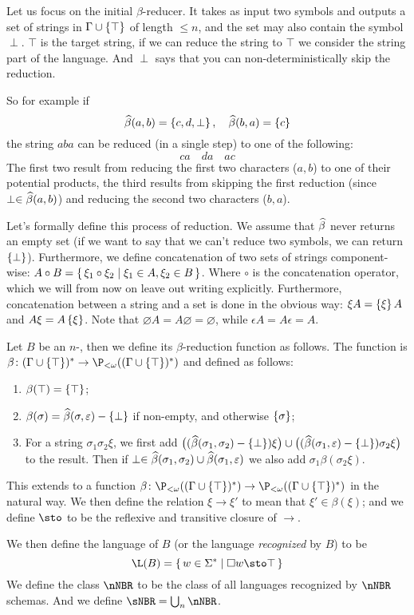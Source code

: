 \documentclass{llncs}
\begin{document}
Let us focus on the initial $\beta$-reducer.
It takes as input two symbols and outputs a set of strings in $\Gamma\cup\set\top$ of length $\leq n$, and the set may also
contain the symbol $\perp$.
$\top$ is the target string, if we can reduce the string to $\top$ we consider the string part of the language.
And $\perp$ says that you can non-deterministically skip the reduction.

So for example if
$$ \hb(a,b) = \set{c,d,\perp},\quad \hb(b,a) = \set{c} $$
the string $aba$ can be reduced (in a single step) to one of the following:
$$ ca\quad da\quad ac $$
The first two result from reducing the first two characters ($a,b$) to one of their potential products, the third results from
skipping the first reduction (since $\perp\in\widehat\beta(a,b)$) and reducing the second two characters ($b,a$).

Let's formally define this process of reduction.
We assume that $\widehat\beta$ never returns an empty set (if we want to say that we can't reduce two symbols, we can return $\set\perp$).
Furthermore, we define concatenation of two sets of strings component-wise:
$A\circ B=\set{\xi_1\circ\xi_2}[\xi_1\in A,\xi_2\in B]$.
Where $\circ$ is the concatenation operator, which we will from now on leave out writing explicitly.
Furthermore, concatenation between a string and a set is done in the obvious way: $\xi A=\set\xi A$ and $A\xi=A\set\xi$.
Note that $\varnothing A=A\varnothing=\varnothing$, while $\epsilon A=A\epsilon=A$.

\begin{definition}

    Let $B$ be an $n$-\NBR, then we define its $\beta$-reduction function as follows.
    The function is $\beta\colon(\Gamma\cup\set\top)^*\to\P_{<\omega}((\Gamma\cup\set\top)^*)$ and defined as follows:
    \begin{enumerate}
        \item $\beta(\top)=\set\top$;
        \item $\beta(\sigma)=\hb(\sigma,\epsilon)-\set\perp$ if non-empty, and otherwise $\set\sigma$;
        \item For a string $\sigma_1\sigma_2\xi$, we first add
        $\bigl((\hb(\sigma_1,\sigma_2)-\set\perp)\xi\bigr)\cup\bigl((\hb(\sigma_1,\epsilon)-\set\perp)\sigma_2\xi\bigr)$ to
        the result.
        Then if $\perp\in\widehat\beta(\sigma_1,\sigma_2)\cup\widehat\beta(\sigma_1,\varepsilon)$ we also add $\sigma_1\beta(\sigma_2\xi)$.
    \end{enumerate}
    This extends to a function $\beta\colon\P_{<\omega}((\Gamma\cup\set\top)^*)\to\P_{<\omega}((\Gamma\cup\set\top)^*)$
    in the natural way.
    We then define the relation $\xi\to\xi'$ to mean that $\xi'\in\beta(\xi)$; and we define $\sto$ to be the reflexive and
    transitive closure of $\to$.

    We then define the language of $B$ (or the language \emph{recognized} by $B$) to be
    $$ \L(B) = \set{w\in\Sigma^*}[\square w\sto\top] $$
    We define the class $\nNBR$ to be the class of all languages recognized by $\nNBR$ schemas.
    And we define $\sNBR=\bigcup_n\nNBR$.

\end{definition}
\end{document}
